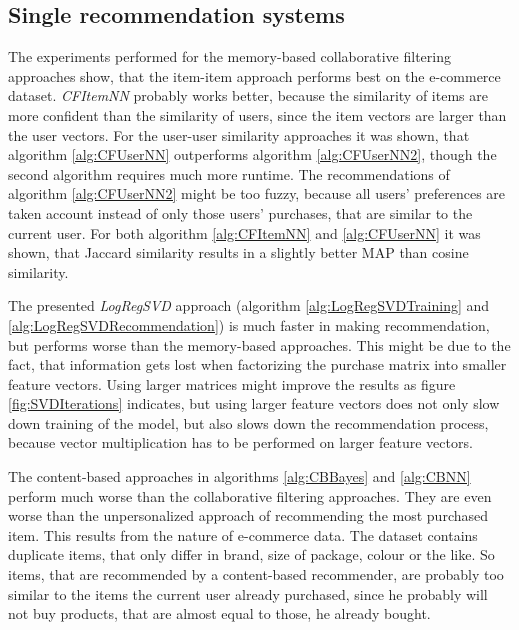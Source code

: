 \documentclass[10pt]{reportMaster}
\begin{document}
\subsection*{Single recommendation systems}
\label{sec:discSingleRecommendationSystems}
The experiments performed for the memory-based collaborative filtering approaches show, that the item-item approach performs best on the e-commerce dataset.
\textit{CFItemNN} probably works better, because the similarity of items are more confident than the similarity of users, since the item vectors are larger than the user vectors.
For the user-user similarity approaches it was shown, that algorithm \ref{alg:CFUserNN} outperforms algorithm \ref{alg:CFUserNN2}, though the second algorithm requires much more runtime.
The recommendations of algorithm \ref{alg:CFUserNN2} might be too fuzzy, because all users' preferences are taken account instead of only those users' purchases, that are similar to the current user.
For both algorithm \ref{alg:CFItemNN} and \ref{alg:CFUserNN} it was shown, that Jaccard similarity results in a slightly better MAP than cosine similarity.

The presented \textit{LogRegSVD} approach (algorithm \ref{alg:LogRegSVDTraining} and \ref{alg:LogRegSVDRecommendation}) is much faster in making recommendation, but performs worse than the memory-based approaches.
This might be due to the fact, that information gets lost when factorizing the purchase matrix into smaller feature vectors.
Using larger matrices might improve the results as figure \ref{fig:SVDIterations} indicates, but using larger feature vectors does not only slow down training of the model, but also slows down the recommendation process, because vector multiplication has to be performed on larger feature vectors.

The content-based approaches in algorithms \ref{alg:CBBayes} and \ref{alg:CBNN} perform much worse than the collaborative filtering approaches.
They are even worse than the unpersonalized approach of recommending the most purchased item.
This results from the nature of e-commerce data.
The dataset contains duplicate items, that only differ in brand, size of package, colour or the like.
So items, that are recommended by a content-based recommender, are probably too similar to the items the current user already purchased, since he probably will not buy products, that are almost equal to those, he already bought.
\end{document}
